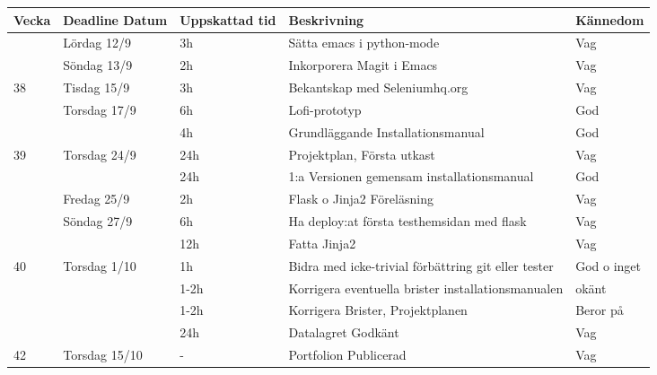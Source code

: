 \documentclass{TDP003mall}
\begin{document}
\begin{tabularx}{\linewidth}{|l|l|l|X|l|}
	\hline
	Vecka & Deadline Datum & Uppskattad tid & Beskrivning                                         & Kännedom    \\ [0.5ex]
	\hline
          & Lördag 12/9    & 3h             & Sätta emacs i python-mode                           & Vag         \\
	\hline
          & Söndag 13/9    & 2h             & Inkorporera Magit i Emacs                           & Vag         \\
	\hline
	38    & Tisdag 15/9    & 3h             & Bekantskap med Seleniumhq.org                       & Vag         \\
	\hline
          & Torsdag 17/9   & 6h             & Lofi-prototyp                                       & God         \\
	\hline
          &                & 4h             & Grundläggande Installationsmanual                   & God         \\
	\hline
	39    & Torsdag 24/9   & 24h            & Projektplan, Första utkast                          & Vag         \\
	\hline
          &                & 24h            & 1:a Versionen gemensam installationsmanual          & God         \\
	\hline
          & Fredag 25/9    & 2h             & Flask o Jinja2 Föreläsning                          & Vag         \\
	\hline
          & Söndag 27/9    & 6h             & Ha deploy:at första testhemsidan med flask          & Vag         \\
	\hline
          &                & 12h            & Fatta Jinja2                                        & Vag         \\
	\hline
	40    & Torsdag 1/10   & 1h             & Bidra med icke-trivial förbättring git eller tester & God o inget \\
	\hline
          &                & 1-2h           & Korrigera eventuella brister installationsmanualen  & okänt       \\
	\hline
          &                & 1-2h           & Korrigera Brister, Projektplanen                    & Beror på    \\
	\hline
          &                & 24h            & Datalagret Godkänt                                  & Vag         \\
	\hline
	42    & Torsdag 15/10  & -              & Portfolion Publicerad                               & Vag         \\

\end{tabularx}
\end{document}
